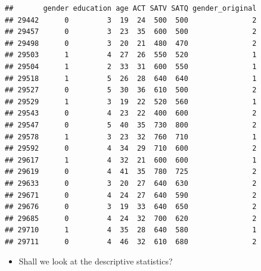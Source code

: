 \documentclass[
]{book}
\newenvironment{Shaded}{\begin{snugshade}}{\end{snugshade}}
\newcommand{\CommentTok}[1]{\textcolor[rgb]{0.56,0.35,0.01}{\textit{#1}}}
\newcommand{\DecValTok}[1]{\textcolor[rgb]{0.00,0.00,0.81}{#1}}
\newcommand{\FunctionTok}[1]{\textcolor[rgb]{0.13,0.29,0.53}{\textbf{#1}}}
\newcommand{\NormalTok}[1]{#1}
\newcommand{\OtherTok}[1]{\textcolor[rgb]{0.56,0.35,0.01}{#1}}
\newcommand{\SpecialCharTok}[1]{\textcolor[rgb]{0.81,0.36,0.00}{\textbf{#1}}}
\providecommand{\tightlist}{%
  \setlength{\itemsep}{0pt}\setlength{\parskip}{0pt}}
\begin{document}
\begin{Shaded}
\end{Shaded}

\begin{verbatim}
##       gender education age ACT SATV SATQ gender_original
## 29442      0         3  19  24  500  500               2
## 29457      0         3  23  35  600  500               2
## 29498      0         3  20  21  480  470               2
## 29503      1         4  27  26  550  520               1
## 29504      1         2  33  31  600  550               1
## 29518      1         5  26  28  640  640               1
## 29527      0         5  30  36  610  500               2
## 29529      1         3  19  22  520  560               1
## 29543      0         4  23  22  400  600               2
## 29547      0         5  40  35  730  800               2
## 29578      1         3  23  32  760  710               1
## 29592      0         4  34  29  710  600               2
## 29617      1         4  32  21  600  600               1
## 29619      0         4  41  35  780  725               2
## 29633      0         3  20  27  640  630               2
## 29671      0         4  24  27  640  590               2
## 29676      0         3  19  33  640  650               2
## 29685      0         4  24  32  700  620               2
## 29710      1         4  35  28  640  580               1
## 29711      0         4  46  32  610  680               2
\end{verbatim}

\begin{itemize}
\tightlist
\item
  Shall we look at the descriptive statistics?
\end{itemize}
\end{document}
